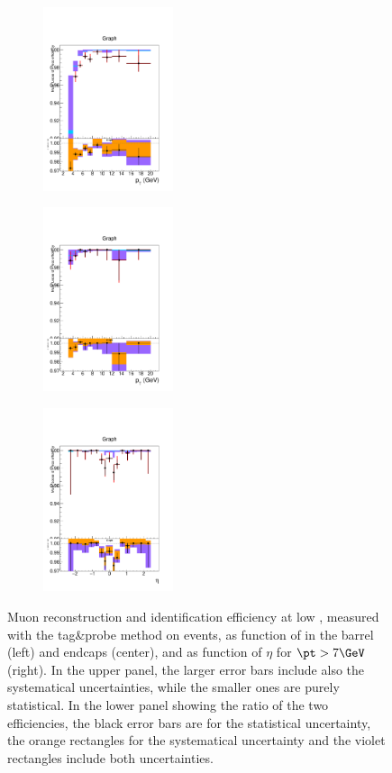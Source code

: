 \begin{figure}[tbh]
\centering
\begin{subfigure}{0.25\textwidth}
\centering
\includegraphics[width=1.5in]{Figures/Muons/mu_Loose_barrel.pdf}
\caption{}
\end{subfigure}
\begin{subfigure}{0.25\textwidth}
\centering
\includegraphics[width=1.5in]{Figures/Muons/mu_Loose_endcap.pdf}
\caption{}
\end{subfigure}
\begin{subfigure}{0.25\textwidth}
\centering
\includegraphics[width=1.5in]{Figures/Muons/mu_Loose_pt7.pdf}
\caption{}
\end{subfigure}
    \caption{Muon reconstruction and identification efficiency at low \pt, measured with the tag\&probe method on \JPsi events, as function of \pt in the barrel (left) and endcaps (center), and as function of $\eta$ for $\pt > 7\GeV$ (right). In the upper panel, the larger error bars include also the systematical uncertainties, while the smaller ones are purely statistical. In the lower panel showing the ratio of the two efficiencies, the black error bars are for the statistical uncertainty, the orange rectangles for the systematical uncertainty and the violet rectangles include both uncertainties.}
\label{fig:MuonIDEff_1}
\end{figure}

